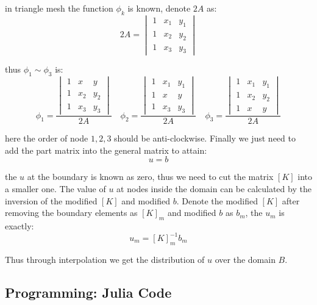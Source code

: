 in triangle mesh the function $\phi_k$ is known, denote $2A$ as:
\begin{equation}
    2A=
    \begin{vmatrix}
        1 & x_1 & y_1\\
        1 & x_2 & y_2\\
        1 & x_3 & y_3
    \end{vmatrix}
\end{equation}

thus $\phi_1\sim \phi_3$ is:
\begin{equation}
    \phi_1=
    \frac{
        \begin{vmatrix}
            1 & x & y\\
            1 & x_2 & y_2\\
            1 & x_3 & y_3
        \end{vmatrix}
    }{2A}
    \quad
    \phi_2=
    \frac{
        \begin{vmatrix}
            1 & x_1 & y_1\\
            1 & x & y\\
            1 & x_3 & y_3
        \end{vmatrix}
    }{2A}\quad
    \phi_3=
    \frac{
        \begin{vmatrix}
            1 & x_1 & y_1\\
            1 & x_2 & y_2\\
            1 & x & y
        \end{vmatrix}
    }{2A}
\end{equation}

here the order of node $1,2,3$ should be anti-clockwise.
Finally we just need to add the part matrix into the general matrix to attain:
\begin{equation}
    [K]u=b
\end{equation}

the $u$ at the boundary is known as zero, thus we need to cut the matrix $[K]$ into a 
smaller one. The value of $u$ at nodes inside the domain can be calculated by the 
inversion of the modified $[K]$ and modified $b$. Denote the modified $[K]$ after removing
 the boundary elements as $[K]_m$ and modified $b$ as $b_m$, the $u_m$ is exactly:
\begin{equation}
    u_m = [K]_m^{-1}b_m
\end{equation}

Thus through interpolation we get the distribution of $u$ over the domain $B$.


\subsection{Programming: Julia Code}

